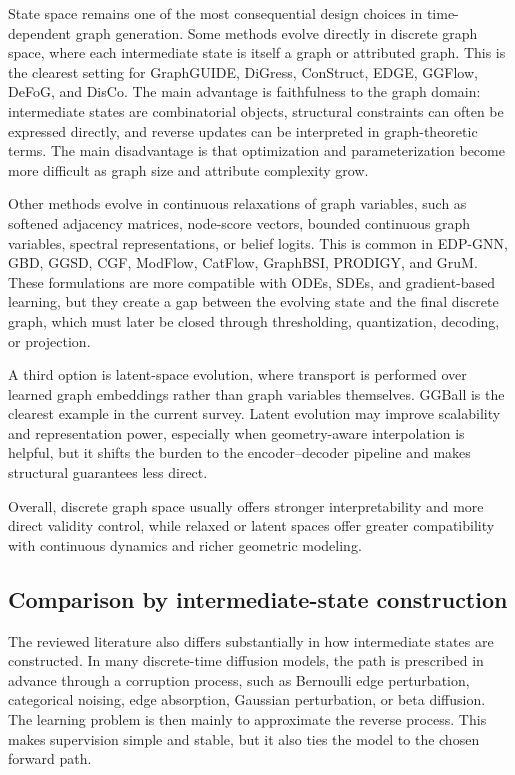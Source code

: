 \documentclass{article}
\begin{document}
State space remains one of the most consequential design choices in time-dependent graph generation. Some methods evolve directly in discrete graph space, where each intermediate state is itself a graph or attributed graph. This is the clearest setting for GraphGUIDE, DiGress, ConStruct, EDGE, GGFlow, DeFoG, and DisCo. The main advantage is faithfulness to the graph domain: intermediate states are combinatorial objects, structural constraints can often be expressed directly, and reverse updates can be interpreted in graph-theoretic terms. The main disadvantage is that optimization and parameterization become more difficult as graph size and attribute complexity grow.

Other methods evolve in continuous relaxations of graph variables, such as softened adjacency matrices, node-score vectors, bounded continuous graph variables, spectral representations, or belief logits. This is common in EDP-GNN, GBD, GGSD, CGF, ModFlow, CatFlow, GraphBSI, PRODIGY, and GruM. These formulations are more compatible with ODEs, SDEs, and gradient-based learning, but they create a gap between the evolving state and the final discrete graph, which must later be closed through thresholding, quantization, decoding, or projection.

A third option is latent-space evolution, where transport is performed over learned graph embeddings rather than graph variables themselves. GGBall is the clearest example in the current survey. Latent evolution may improve scalability and representation power, especially when geometry-aware interpolation is helpful, but it shifts the burden to the encoder--decoder pipeline and makes structural guarantees less direct.

Overall, discrete graph space usually offers stronger interpretability and more direct validity control, while relaxed or latent spaces offer greater compatibility with continuous dynamics and richer geometric modeling.


\subsection{Comparison by intermediate-state construction}

The reviewed literature also differs substantially in how intermediate states are constructed. In many discrete-time diffusion models, the path is prescribed in advance through a corruption process, such as Bernoulli edge perturbation, categorical noising, edge absorption, Gaussian perturbation, or beta diffusion. The learning problem is then mainly to approximate the reverse process. This makes supervision simple and stable, but it also ties the model to the chosen forward path.
\end{document}

